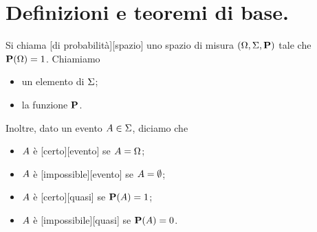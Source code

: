 \section{Definizioni e teoremi di base.}
\label{Probabilita_DefinizioniETeoremiDiBase}
\begin{Definition}
  Si chiama [di probabilit\`a][spazio] uno
  spazio di misura $(\SamplesSpace,\Events,\Probability)$ tale che
  $\Probability(\SamplesSpace) = 1$. Chiamiamo
  \begin{itemize}
    \item {} un elemento di $\Sigma$;
    \item {} la funzione $\Probability$.
  \end{itemize}
  Inoltre, dato un evento $A \in \Sigma$, diciamo che
  \begin{itemize}
    \item $A$ \`e [certo][evento] se
      $A = \Omega$;
    \item $A$ \`e [impossible][evento] se
      $A = \emptyset$;
    \item $A$ \`e [certo][quasi] se
      $\Probability(\Event) = 1$;
    \item $A$ \`e [impossibile][quasi] se
      $\Probability(\Event) = 0$.
  \end{itemize}
\end{Definition}
